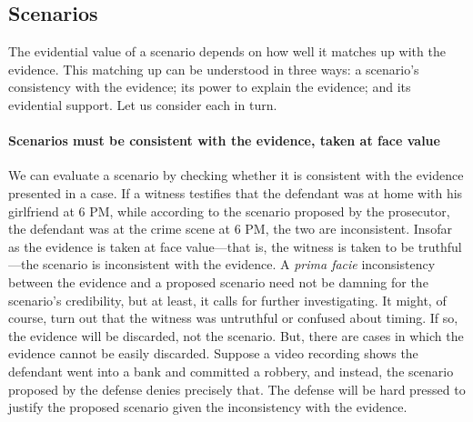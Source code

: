 \documentclass[10pt]{article}
\begin{document}

\subsection{Scenarios}

The evidential value of a scenario depends on how well it matches up with the evidence. 
This matching up can be understood in three ways: a scenario's consistency 
with the evidence; its power to explain the evidence; 
and its evidential support. Let us consider each in turn.


\paragraph{Scenarios must be consistent with the evidence, taken at face value}

We can evaluate a scenario by checking whether it is consistent with the evidence presented in a case.
If a witness testifies that the defendant was at home with his girlfriend 
at 6 PM, while according to the scenario proposed by the prosecutor, 
the defendant was at the crime scene at 6 PM, the 
two are inconsistent. Insofar as the evidence 
is taken at face value---that is, the witness is taken to be truthful---the scenario 
is inconsistent with the evidence. A \textit{prima facie} inconsistency 
between the evidence and a proposed scenario need not be damning for the scenario's credibility, 
but at least, it calls for further investigating.  It might, of course, turn out that the witness was untruthful or confused about 
timing.  If so, the evidence will be discarded, not the scenario. But, there are cases in which the evidence 
cannot be easily discarded. Suppose a video recording shows the defendant went into a bank 
and committed a robbery, and instead, the scenario proposed by the defense denies precisely that. The defense 
will be hard pressed to justify the proposed scenario given the inconsistency 
with the evidence. 
\end{document}
